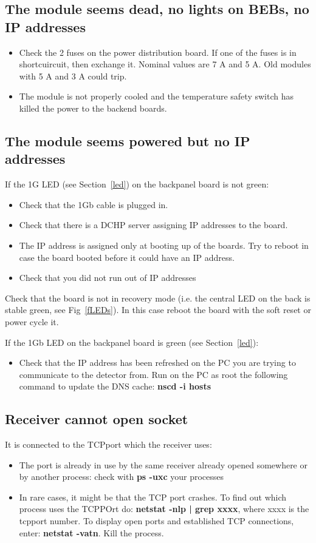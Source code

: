 \documentclass{article}
\begin{document}
\subsection{The module seems dead, no lights on BEBs, no IP addresses}
\begin{itemize}
\item Check the 2 fuses on the power distribution board. If one of the fuses is in shortcuircuit, then exchange it. Nominal values are 7 A and 5 A. Old modules with 5 A and 3 A could trip.
\item The module is not properly cooled and the temperature safety switch has killed the power to the backend boards. 
\end{itemize}

\subsection{The module seems powered but no IP addresses}
If the 1G LED (see Section~\ref{led}) on the backpanel board is not green:
\begin{itemize}
\item Check that the 1Gb cable is plugged in.
\item Check that there is a DCHP server assigning IP addresses to the board.
\item The IP address is assigned only at booting up of the boards. Try to reboot in case the board booted before it could have an IP address. 
\item Check that you did not run out of IP addresses 
\end{itemize}
 Check that the board is not in recovery mode (i.e. the central LED on the back is stable green, see Fig~\ref{fLEDs}). In this case reboot the board with the soft reset or power cycle it.

If the 1Gb LED on the backpanel board is green (see Section~\ref{led}):
\begin{itemize}
\item Check that the IP address has been refreshed on the PC you are trying to communicate to the detector from. Run on the PC as root the following command to update the DNS cache: \textbf{nscd -i hosts} 
\end{itemize}

\subsection{Receiver cannot open socket}
It is connected to the TCPport which the receiver uses:
\begin{itemize}
\item The port is already in use by the same receiver already opened somewhere or by another process: check with \textbf{ps -uxc} your processes
\item In rare cases, it might be that the TCP port crashes. To find out which process uses the TCPPOrt do: \textbf{netstat -nlp | grep xxxx}, where xxxx is the tcpport number. To display open ports and established TCP connections, enter: \textbf{netstat -vatn}. Kill the process.
 \end{itemize}
\end{document}

